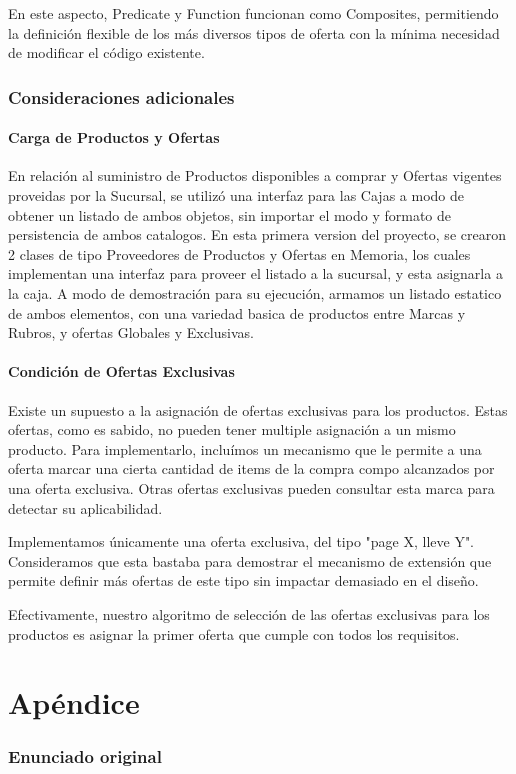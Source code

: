 \documentclass[a4paper,11pt]{article}
\begin{document}
En este aspecto, Predicate y Function funcionan como Composites, permitiendo la
definición flexible de los más diversos tipos de oferta con la mínima necesidad
de modificar el código existente.

\section{Consideraciones adicionales}

\subsection{Carga de Productos y Ofertas}

En relación al suministro de Productos disponibles a comprar y Ofertas vigentes
proveidas por la Sucursal, se utilizó una interfaz para las Cajas a modo de
obtener un listado de ambos objetos, sin importar el modo y formato de
persistencia de ambos catalogos.  En esta primera version del proyecto, se
crearon 2 clases de tipo Proveedores de Productos y Ofertas en Memoria, los
cuales implementan una interfaz para proveer el listado a la sucursal, y esta
asignarla a la caja.  A modo de demostración para su ejecución, armamos un
listado estatico de ambos elementos, con una variedad basica de productos entre
Marcas y Rubros, y ofertas Globales y Exclusivas.


\subsection{Condición de Ofertas Exclusivas}

Existe un supuesto a la asignación de ofertas exclusivas para los productos.
Estas ofertas, como es sabido, no pueden tener multiple asignación a un mismo
producto. Para implementarlo, incluímos un mecanismo que le permite a una
oferta marcar una cierta cantidad de items de la compra compo alcanzados por
una oferta exclusiva. Otras ofertas exclusivas pueden consultar esta marca para
detectar su aplicabilidad.

Implementamos únicamente una oferta exclusiva, del tipo "page X, lleve Y".
Consideramos que esta bastaba para demostrar el mecanismo de extensión que
permite definir más ofertas de este tipo sin impactar demasiado en el diseño.

Efectivamente, nuestro algoritmo de selección de las ofertas exclusivas para
los productos es asignar la primer oferta que cumple con todos los requisitos.

\clearpage

\part{Apéndice}
\appendix

\section{Enunciado original}\label{sec:enunciado}

\end{document}

